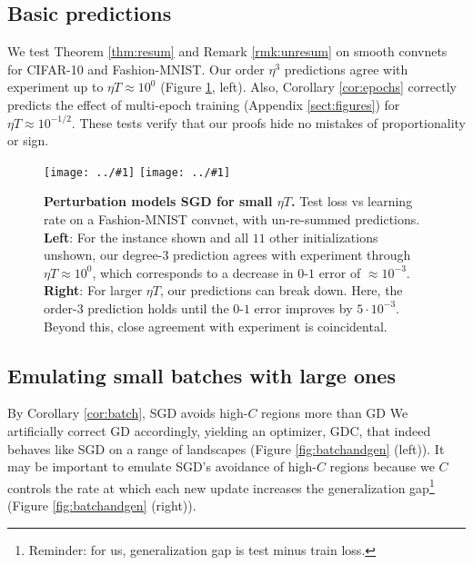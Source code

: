 \documentclass{article}
\theoremstyle{plain}
\theoremstyle{definition}
\newcommand{\plotmooh}[3]{\texttt{[image: ../\#1]}}
\begin{document}

    \subsection{Basic predictions}
        We test Theorem \ref{thm:resum} and Remark \ref{rmk:unresum} on smooth
        convnets for CIFAR-10 and Fashion-MNIST.  Our order $\eta^3$
        predictions agree with experiment up to $\eta T \approx 10^0$ (Figure
        \ref{fig:vanilla}, left).  Also, Corollary \ref{cor:epochs}
        correctly predicts the effect of multi-epoch training (Appendix
        \ref{sect:figures}) for $\eta T \approx 10^{-1/2}$.  These tests verify
        that our proofs hide no mistakes of proportionality or sign.  

        \begin{figure}[h!] 
            \centering
            \plotmooh{plots/new-test-0}{}{3.0cm} 
            \plotmooh{plots/rebut-test-1-T100}{}{3.0cm} 
            \caption{
                {\bf Perturbation models SGD for small $\eta T$.}
                Test loss vs learning rate on a Fashion-MNIST convnet, with
                un-re-summed predictions.
                {\bf Left}: For the instance shown and all $11$ other
                initializations unshown, our degree-$3$ prediction
                agrees with experiment through $\eta T \approx 10^0$, which
                corresponds to a decrease in $0\mbox{-}1$ error of $\approx
                10^{-3}$.
                {\bf Right}: For larger $\eta T$, our predictions can break
                down.  Here, the order-$3$ prediction holds until the $0\mbox{-}1$
                error improves by $5\cdot 10^{-3}$.  Beyond this, close
                agreement with experiment is coincidental.
            }
            \label{fig:vanilla}
        \end{figure}




    \subsection{Emulating small batches with large ones}
        By Corollary \ref{cor:batch}, SGD avoids high-$C$ regions more than GD
        We artificially correct GD accordingly, yielding an optimizer, GDC,
        that indeed behaves like SGD on a range of landscapes (Figure
        \ref{fig:batchandgen} (left)).  It may be important to emulate SGD's
        avoidance of high-$C$ regions because we $C$ controls the rate at which
        each new update increases the generalization gap\footnote{Reminder: for
        us, generalization gap is test minus train loss.} (Figure
        \ref{fig:batchandgen} (right)).
        
\end{document}
